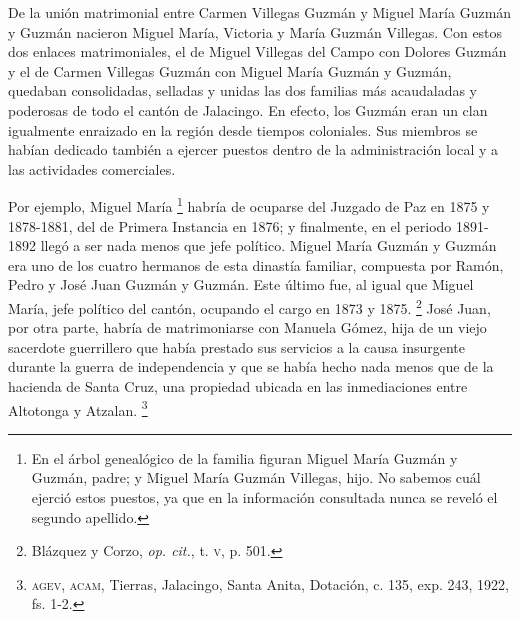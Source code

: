 \documentclass[14pt,twoside,final]{extbook} %
\let\oldfootnote\footnote
\renewcommand\footnote[1]{%
\oldfootnote{\hspace{1mm}#1}}
\begin{document}
De la unión matrimonial entre Carmen Villegas Guzmán y Miguel María Guzmán y Guzmán nacieron Miguel María, Victoria y María Guzmán Villegas. Con estos dos enlaces matrimoniales, el de Miguel Villegas del Campo con Dolores Guzmán y el de Carmen Villegas Guzmán con Miguel María Guzmán y Guzmán, quedaban consolidadas, selladas y unidas las dos familias más acaudaladas y poderosas de todo el cantón de Jalacingo. En efecto, los Guzmán eran un clan igualmente enraizado en la región desde tiempos coloniales. Sus miembros se habían dedicado también a ejercer puestos dentro de la administración local y a las actividades comerciales.

Por ejemplo, Miguel María\footnote{En el árbol genealógico de la familia figuran Miguel María Guzmán y Guzmán, padre; y Miguel María Guzmán Villegas, hijo. No sabemos cuál ejerció estos puestos, ya que en la información consultada nunca se reveló el segundo apellido.} habría de ocuparse del Juzgado de Paz en 1875 y 1878-1881, del de Primera Instancia en 1876; y finalmente, en el periodo 1891-1892
llegó a ser nada menos que jefe político. Miguel María Guzmán y Guzmán era uno de los cuatro hermanos de esta dinastía familiar, compuesta por Ramón, Pedro y José Juan Guzmán y Guzmán. Este último fue, al igual que Miguel María, jefe político del cantón, ocupando el cargo en 1873 y 1875.\footnote{Blázquez y Corzo, \emph{op. cit.}, t. \textsc{v}, p. 501.} José Juan, por otra parte, habría de matrimoniarse con Manuela Gómez, hija de un viejo sacerdote guerrillero que había prestado sus servicios a la causa insurgente durante la guerra de independencia y que se había hecho
nada menos que de la hacienda de Santa Cruz, una propiedad ubicada en las inmediaciones entre Altotonga y Atzalan.\footnote{\textsc{agev, acam}, Tierras, Jalacingo, Santa Anita, Dotación, c. 135, exp. 243, 1922, fs. 1-2.}
\end{document}
